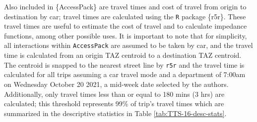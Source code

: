 \documentclass[Royal,times,sageh]{sagej}
\begin{document}
Also included in \{AccessPack\} are travel times and cost of travel from
origin to destination by car; travel times are calculated using the
\texttt{R} package \{r5r\}. These travel times are useful to estimate
the cost of travel and to calculate impedance functions, among other
possible uses. It is important to note that for simplicity, all
interactions within \texttt{AccessPack} are assumed to be taken by car,
and the travel time is calculated from an origin TAZ centroid to a
destination TAZ centroid. The centroid is snapped to the nearest street
line by \texttt{r5r} and the travel time is calculated for all trips
assuming a car travel mode and a department of 7:00am on Wednesday
October 20 2021, a mid-week date selected by the authors. Additionally,
only travel times less than or equal to 180 mins (3 hrs) are calculated;
this threshold represents 99\% of trip's travel times which are
summarized in the descriptive statistics in Table
\ref{tab:TTS-16-desc-stats}.
\end{document}
